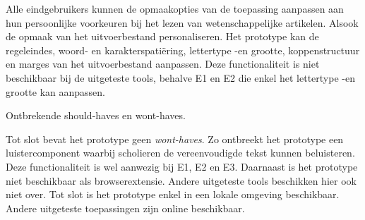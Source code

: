\medspace

Alle eindgebruikers kunnen de opmaakopties van de toepassing aanpassen aan hun persoonlijke voorkeuren bij het lezen van wetenschappelijke artikelen. Alsook de opmaak van het uitvoerbestand personaliseren. Het prototype kan de regeleindes, woord- en karakterspatiëring, lettertype -en grootte, koppenstructuur en marges van het uitvoerbestand aanpassen. Deze functionaliteit is niet beschikbaar bij de uitgeteste tools, behalve E1 en E2 die enkel het lettertype -en grootte kan aanpassen. 

\medspace

Ontbrekende should-haves en wont-haves.

\medspace

Tot slot bevat het prototype geen \textit{wont-haves}. Zo ontbreekt het prototype een luistercomponent waarbij scholieren de vereenvoudigde tekst kunnen beluisteren. Deze functionaliteit is wel aanwezig bij E1, E2 en E3. Daarnaast is het prototype niet beschikbaar als browserextensie. Andere uitgeteste tools beschikken hier ook niet over. Tot slot is het prototype enkel in een lokale omgeving beschikbaar. Andere uitgeteste toepassingen zijn online beschikbaar. 

